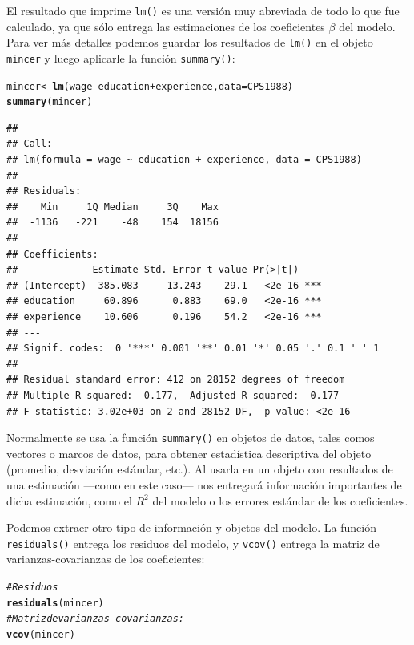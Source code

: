\documentclass{article}\usepackage[]{graphicx}\usepackage[]{color}
\makeatletter
\newcommand{\hlcom}[1]{\textcolor[rgb]{0.678,0.584,0.686}{\textit{#1}}}%
\newcommand{\hlopt}[1]{\textcolor[rgb]{0,0,0}{#1}}%
\newcommand{\hlstd}[1]{\textcolor[rgb]{0.345,0.345,0.345}{#1}}%
\newcommand{\hlkwb}[1]{\textcolor[rgb]{0.69,0.353,0.396}{#1}}%
\newcommand{\hlkwc}[1]{\textcolor[rgb]{0.333,0.667,0.333}{#1}}%
\newcommand{\hlkwd}[1]{\textcolor[rgb]{0.737,0.353,0.396}{\textbf{#1}}}%
\newenvironment{kframe}{%
 \def\at@end@of@kframe{}%
 \ifinner\ifhmode%
  \def\at@end@of@kframe{\end{minipage}}%
  \begin{minipage}{\columnwidth}%
 \fi\fi%
 \def\FrameCommand##1{\hskip\@totalleftmargin \hskip-\fboxsep
 \colorbox{shadecolor}{##1}\hskip-\fboxsep
     \hskip-\linewidth \hskip-\@totalleftmargin \hskip\columnwidth}%
 \MakeFramed {\advance\hsize-\width
   \@totalleftmargin\z@ \linewidth\hsize
   \@setminipage}}%
 {\par\unskip\endMakeFramed%
 \at@end@of@kframe}
\newenvironment{knitrout}{}{} %
\makeatother
\begin{document}
El resultado que imprime \verb|lm()| es una versión muy abreviada de todo lo que fue calculado, ya que sólo entrega las estimaciones de los coeficientes $\beta$ del modelo. Para ver más detalles podemos guardar los resultados de \verb|lm()| en el objeto \verb|mincer| y luego aplicarle la función \verb|summary()|:

\begin{knitrout}
\color{fgcolor}\begin{kframe}
\begin{alltt}
\hlstd{mincer} \hlkwb{<-} \hlkwd{lm}\hlstd{(wage} \hlopt{~} \hlstd{education} \hlopt{+} \hlstd{experience,} \hlkwc{data} \hlstd{= CPS1988)}
\hlkwd{summary}\hlstd{(mincer)}
\end{alltt}
\begin{verbatim}
## 
## Call:
## lm(formula = wage ~ education + experience, data = CPS1988)
## 
## Residuals:
##    Min     1Q Median     3Q    Max 
##  -1136   -221    -48    154  18156 
## 
## Coefficients:
##             Estimate Std. Error t value Pr(>|t|)    
## (Intercept) -385.083     13.243   -29.1   <2e-16 ***
## education     60.896      0.883    69.0   <2e-16 ***
## experience    10.606      0.196    54.2   <2e-16 ***
## ---
## Signif. codes:  0 '***' 0.001 '**' 0.01 '*' 0.05 '.' 0.1 ' ' 1
## 
## Residual standard error: 412 on 28152 degrees of freedom
## Multiple R-squared:  0.177,	Adjusted R-squared:  0.177 
## F-statistic: 3.02e+03 on 2 and 28152 DF,  p-value: <2e-16
\end{verbatim}
\end{kframe}
\end{knitrout}

Normalmente se usa la función \verb|summary()| en objetos de datos, tales comos vectores o marcos de datos, para obtener estadística descriptiva del objeto (promedio, desviación estándar, etc.). Al usarla en un objeto con resultados de una estimación ---como en este caso--- nos entregará información importantes de dicha estimación, como el $R^2$ del modelo o los errores estándar de los coeficientes.

Podemos extraer otro tipo de información y objetos del modelo. La función \verb|residuals()| entrega los residuos del modelo, y \verb|vcov()| entrega la matriz de varianzas-covarianzas de los coeficientes:

\begin{knitrout}
\color{fgcolor}\begin{kframe}
\begin{alltt}
\hlcom{# Residuos}
\hlkwd{residuals}\hlstd{(mincer)}
\hlcom{# Matriz de varianzas-covarianzas:}
\hlkwd{vcov}\hlstd{(mincer)}
\end{alltt}
\end{kframe}
\end{knitrout}
\end{document}
